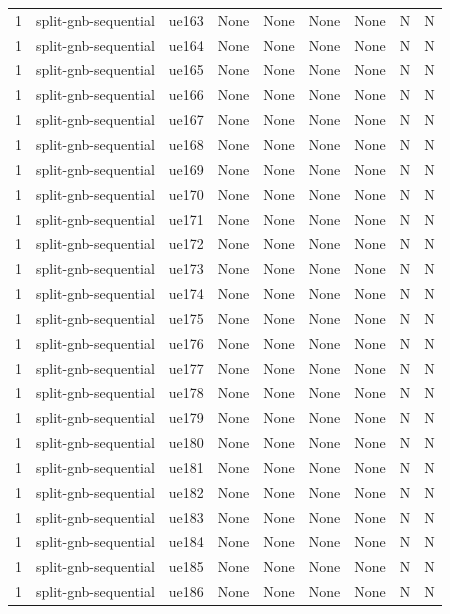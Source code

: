 \begin{table}[ht]
\begin{tabular}{|c|c|c|c|c|c|c|c|c|}
1 & split-gnb-sequential & ue163 & None & None & None & None & N & N \\
1 & split-gnb-sequential & ue164 & None & None & None & None & N & N \\
1 & split-gnb-sequential & ue165 & None & None & None & None & N & N \\
1 & split-gnb-sequential & ue166 & None & None & None & None & N & N \\
1 & split-gnb-sequential & ue167 & None & None & None & None & N & N \\
1 & split-gnb-sequential & ue168 & None & None & None & None & N & N \\
1 & split-gnb-sequential & ue169 & None & None & None & None & N & N \\
1 & split-gnb-sequential & ue170 & None & None & None & None & N & N \\
1 & split-gnb-sequential & ue171 & None & None & None & None & N & N \\
1 & split-gnb-sequential & ue172 & None & None & None & None & N & N \\
1 & split-gnb-sequential & ue173 & None & None & None & None & N & N \\
1 & split-gnb-sequential & ue174 & None & None & None & None & N & N \\
1 & split-gnb-sequential & ue175 & None & None & None & None & N & N \\
1 & split-gnb-sequential & ue176 & None & None & None & None & N & N \\
1 & split-gnb-sequential & ue177 & None & None & None & None & N & N \\
1 & split-gnb-sequential & ue178 & None & None & None & None & N & N \\
1 & split-gnb-sequential & ue179 & None & None & None & None & N & N \\
1 & split-gnb-sequential & ue180 & None & None & None & None & N & N \\
1 & split-gnb-sequential & ue181 & None & None & None & None & N & N \\
1 & split-gnb-sequential & ue182 & None & None & None & None & N & N \\
1 & split-gnb-sequential & ue183 & None & None & None & None & N & N \\
1 & split-gnb-sequential & ue184 & None & None & None & None & N & N \\
1 & split-gnb-sequential & ue185 & None & None & None & None & N & N \\
1 & split-gnb-sequential & ue186 & None & None & None & None & N & N \\

\end{tabular}
\end{table}
